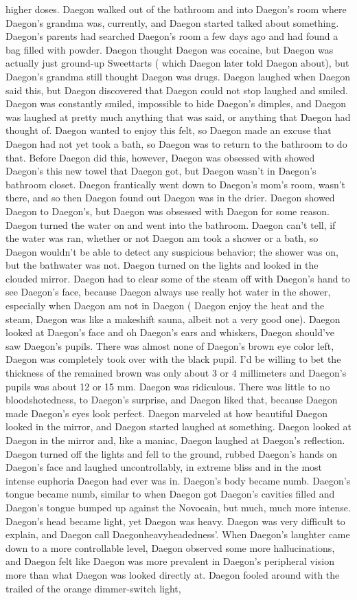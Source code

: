 \documentclass[12pt]{book}
\begin{document}
higher doses. Daegon walked out of the bathroom and into Daegon's room where Daegon's grandma was, currently, and Daegon started talked about something. Daegon's parents had searched Daegon's room a few days ago and had found a bag filled with powder. Daegon thought Daegon was cocaine, but Daegon was actually just ground-up Sweettarts ( which Daegon later told Daegon about), but Daegon's grandma still thought Daegon was drugs. Daegon laughed when Daegon said this, but Daegon discovered that Daegon could not stop laughed and smiled. Daegon was constantly smiled, impossible to hide Daegon's dimples, and Daegon was laughed at pretty much anything that was said, or anything that Daegon had thought of. Daegon wanted to enjoy this felt, so Daegon made an excuse that Daegon had not yet took a bath, so Daegon was to return to the bathroom to do that. Before Daegon did this, however, Daegon was obsessed with showed Daegon's this new towel that Daegon got, but Daegon wasn't in Daegon's bathroom closet. Daegon frantically went down to Daegon's mom's room, wasn't there, and so then Daegon found out Daegon was in the drier. Daegon showed Daegon to Daegon's, but Daegon was obsessed with Daegon for some reason. Daegon turned the water on and went into the bathroom. Daegon can't tell, if the water was ran, whether or not Daegon am took a shower or a bath, so Daegon wouldn't be able to detect any suspicious behavior; the shower was on, but the bathwater was not. Daegon turned on the lights and looked in the clouded mirror. Daegon had to clear some of the steam off with Daegon's hand to see Daegon's face, because Daegon always use really hot water in the shower, especially when Daegon am not in Daegon ( Daegon enjoy the heat and the steam, Daegon was like a makeshift sauna, albeit not a very good one). Daegon looked at Daegon's face and oh Daegon's ears and whiskers, Daegon should've saw Daegon's pupils. There was almost none of Daegon's brown eye color left, Daegon was completely took over with the black pupil. I'd be willing to bet the thickness of the remained brown was only about 3 or 4 millimeters and Daegon's pupils was about 12 or 15 mm. Daegon was ridiculous. There was little to no bloodshotedness, to Daegon's surprise, and Daegon liked that, because Daegon made Daegon's eyes look perfect. Daegon marveled at how beautiful Daegon looked in the mirror, and Daegon started laughed at something. Daegon looked at Daegon in the mirror and, like a maniac, Daegon laughed at Daegon's reflection. Daegon turned off the lights and fell to the ground, rubbed Daegon's hands on Daegon's face and laughed uncontrollably, in extreme bliss and in the most intense euphoria Daegon had ever was in. Daegon's body became numb. Daegon's tongue became numb, similar to when Daegon got Daegon's cavities filled and Daegon's tongue bumped up against the Novocain, but much, much more intense. Daegon's head became light, yet Daegon was heavy. Daegon was very difficult to explain, and Daegon call Daegonheavyheadedness'. When Daegon's laughter came down to a more controllable level, Daegon observed some more hallucinations, and Daegon felt like Daegon was more prevalent in Daegon's peripheral vision more than what Daegon was looked directly at. Daegon fooled around with the trailed of the orange dimmer-switch light, 
\end{document}
